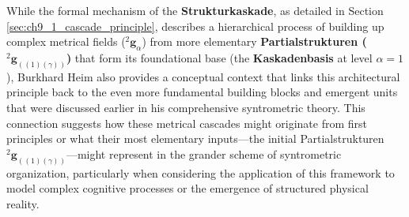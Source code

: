 \documentclass[
    12pt,              %
    a4paper,           %
    headings=normal,   %
    twoside=true,      %
    BCOR=8mm,          %
]{scrbook}
\newcommand{\kompositionsfeld}{{}^2\mathbf{g}}
\newcommand{\partialstruktur}[1]{{}^2\mathbf{g}_{(#1)}}
\newcommand{\kaskadenstufe}{\alpha}
\begin{document}
While the formal mechanism of the \textbf{Strukturkaskade}, as detailed in Section \ref{sec:ch9_1_cascade_principle}, describes a hierarchical process of building up complex metrical fields (\(\kompositionsfeld_\alpha\)) from more elementary \textbf{Partialstrukturen (\(\partialstruktur{(1)(\gamma)}\))} that form its foundational base (the \textbf{Kaskadenbasis} at level \(\kaskadenstufe=1\)), Burkhard Heim also provides a conceptual context that links this architectural principle back to the even more fundamental building blocks and emergent units that were discussed earlier in his comprehensive syntrometric theory. This connection suggests how these metrical cascades might originate from first principles or what their most elementary inputs—the initial Partialstrukturen \(\partialstruktur{(1)(\gamma)}\)—might represent in the grander scheme of syntrometric organization, particularly when considering the application of this framework to model complex cognitive processes or the emergence of structured physical reality.
\end{document}
